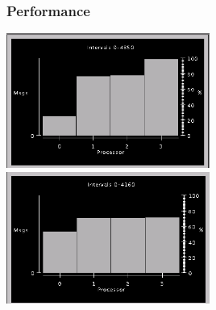 \begin{frame}
\frametitle{Performance}
\begin{centering}
\includegraphics[width=0.5\textwidth]{figures/beforeLB}
\includegraphics[width=0.5\textwidth]{figures/afterLB}
\end{centering}
\end{frame}

%

